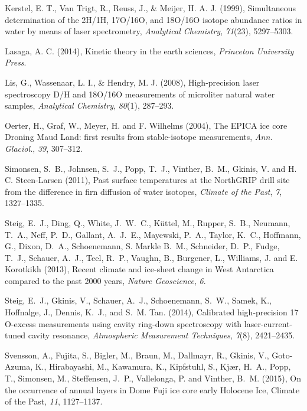 \documentclass[draft, jgrga]{AGUTeX}
\begin{document}
\begin{article}
\begin{thebibliography}{}
Kerstel, E. T., Van Trigt, R., Reuss, J., \& Meijer, H. A. J. (1999),
{Simultaneous determination of the 2H/1H, 17O/16O, and 18O/16O isotope abundance ratios in water by means of laser spectrometry},
\textit{Analytical Chemistry}, \textit{71}(23), 5297--5303.

Lasaga, A. C. (2014),
{Kinetic theory in the earth sciences},
\textit{Princeton University Press}.

Lis, G., Wassenaar, L. I., \& Hendry, M. J. (2008),
{High-precision laser spectroscopy D/H and 18O/16O measurements of microliter natural water samples},
\textit{Analytical Chemistry}, \textit{80}(1), 287--293.

Oerter, H., Graf, W., Meyer, H. and F. Wilhelms (2004),
{The EPICA ice core Droning Maud Land: first results from stable-isotope measurements},
\textit{Ann. Glaciol.}, \textit{39}, 307--312.

Simonsen, S.~B., Johnsen, S.~J., Popp, T.~J., Vinther, B.~M., Gkinis, V. and H. C. Steen-Larsen (2011),
{Past surface temperatures at the NorthGRIP drill site from the difference in firn diffusion of water isotopes},
\textit{Climate of the Past}, \textit{7}, 1327--1335.

Steig, E.~J., Ding, Q., White, J.~W.~C., Küttel, M., Rupper, S.~B., Neumann, T.~A., Neff, P.~D., Gallant, A.~J.~E., Mayewski, P.~A.,
Taylor, K.~C., Hoffmann, G., Dixon, D.~A., Schoenemann, S. Markle B.~M., Schneider, D.~P., Fudge, T.~J.,
Schauer, A.~J., Teel, R.~P., Vaughn, B., Burgener, L., Williams, J. and E. Korotkikh (2013),
{Recent climate and ice-sheet change in West Antarctica compared to the past 2000 years},
\textit{Nature Geoscience}, \textit{6}.

 Steig, E.~J., Gkinis, V., Schauer, A.~J., Schoenemann, S.~W., Samek, K., Hoffnalge, J., Dennis, K.~J., and S.~M. Tan. (2014), {Calibrated high-precision 17 O-excess measurements using cavity ring-down spectroscopy with laser-current-tuned cavity resonance}, \textit{Atmospheric Measurement Techniques}, \textit{7}(8), 2421--2435.

Svensson, A., Fujita, S., Bigler, M., Braun, M., Dallmayr, R., Gkinis, V.,
Goto-Azuma, K., Hirabayashi, M., Kawamura, K., Kipfstuhl, S., Kjær, H.~A.,
Popp, T., Simonsen, M., Steffensen, J.~P., Vallelonga, P. and Vinther, B.~M. (2015),
{On the occurrence of annual layers in Dome Fuji ice core early Holocene Ice},
{Climate of	the Past}, \textit{11}, 1127--1137.


\end{thebibliography}
\end{article}
\end{document}
